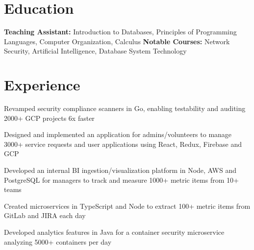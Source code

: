 \documentclass[]{deedy-resume}
\begin{document}
%
%



\section{Education}

\textbf{Teaching Assistant:} Introduction to Databases, Principles of Programming Languages, Computer Organization, Calculus
\newline
\textbf{Notable Courses:} Network Security, Artificial Intelligence, Database System Technology
\sectionsep

\section{Experience}

\begin{tightemize}
\item Revamped security compliance scanners in Go, enabling testability and auditing 2000+ GCP projects 6x faster
\end{tightemize}
\sectionsep

\begin{tightemize}
\item Designed and implemented an application for admins/volunteers to manage 3000+ service requests and user applications using React, Redux, Firebase and GCP
\end{tightemize}
\sectionsep

\begin{tightemize}
\item Developed an internal BI ingestion/visualization platform in Node, AWS and PostgreSQL for managers to track and measure 1000+ metric items from 10+ teams
\item Created microservices in TypeScript and Node to extract 100+ metric items from GitLab and JIRA each day
\item Developed analytics features in Java for a container security microservice analyzing 5000+ containers per day
\end{tightemize}
\sectionsep
\end{document}
